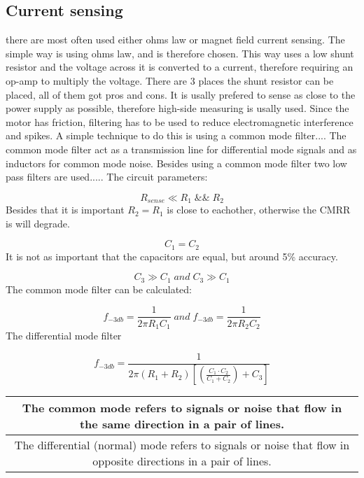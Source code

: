 \subsection{Current sensing}


there are most often used either ohms law or magnet field current sensing. The simple way is using ohms law, and is therefore chosen. This way uses a low shunt resistor and the voltage across it is converted to a current, therefore requiring an op-amp to multiply the voltage. There are 3 places the shunt resistor can be placed, all of them got pros and cons. It is usally prefered to sense as close to the power supply as possible, therefore high-side measuring is usally used. Since the motor has friction, filtering has to be used to reduce electromagnetic interference and spikes. A simple technique to do this is using a common mode filter.... The common mode filter act as a transmission line for differential mode signals and as inductors for common mode noise. Besides using a common mode filter two low pass filters are used..... 
The circuit parameters:

\[
R_{sense}\ll R_{1}\;\&\&\;R_{2}
\]
Besides that it is important $R_{2}=R_{1}$ is close to eachother,
otherwise the CMRR is will degrade.

\[
C_{1}=C_{2}
\]
It is not as important that the capacitors are equal, but around 5\%
accuracy.

\[
C_{3}\gg C_{1}\;and\;C_{3}\gg C_{1}
\]
The common mode filter can be calculated:

\[
f_{-3db}=\frac{1}{2\pi R_{1}C_{1}}\;and\;f_{-3db}=\frac{1}{2\pi R_{2}C_{2}}
\]
The differential mode filter

\[
f_{-3db}=\frac{1}{2\pi\left(R_{1}+R_{2}\right)\left[\left(\frac{C_{1}\cdot C_{2}}{C_{1}+C_{2}}\right)+C_{3}\right]}
\]

\begin{tabular}{|c|}
\hline 
The common mode refers to signals or noise that flow in the same direction
in a pair of lines.\tabularnewline
\hline 
\hline 
The differential (normal) mode refers to signals or noise that flow
in opposite directions in a pair of lines.\tabularnewline
\hline 
\end{tabular}